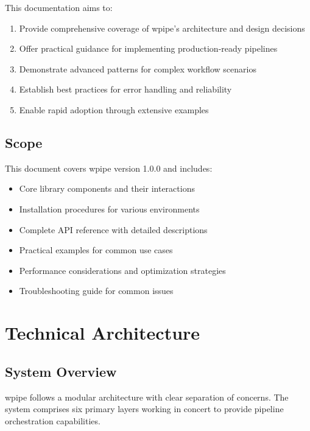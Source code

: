 \documentclass[12pt,a4paper]{report}
\begin{document}
This documentation aims to:

\begin{enumerate}
    \item Provide comprehensive coverage of wpipe's architecture and design decisions
    \item Offer practical guidance for implementing production-ready pipelines
    \item Demonstrate advanced patterns for complex workflow scenarios
    \item Establish best practices for error handling and reliability
    \item Enable rapid adoption through extensive examples
\end{enumerate}

\section{Scope}

This document covers wpipe version 1.0.0 and includes:
\begin{itemize}
    \item Core library components and their interactions
    \item Installation procedures for various environments
    \item Complete API reference with detailed descriptions
    \item Practical examples for common use cases
    \item Performance considerations and optimization strategies
    \item Troubleshooting guide for common issues
\end{itemize}

\chapter{Technical Architecture}
\cleardoublepage

\section{System Overview}

wpipe follows a modular architecture with clear separation of concerns. The system comprises six primary layers working in concert to provide pipeline orchestration capabilities.
\end{document}
